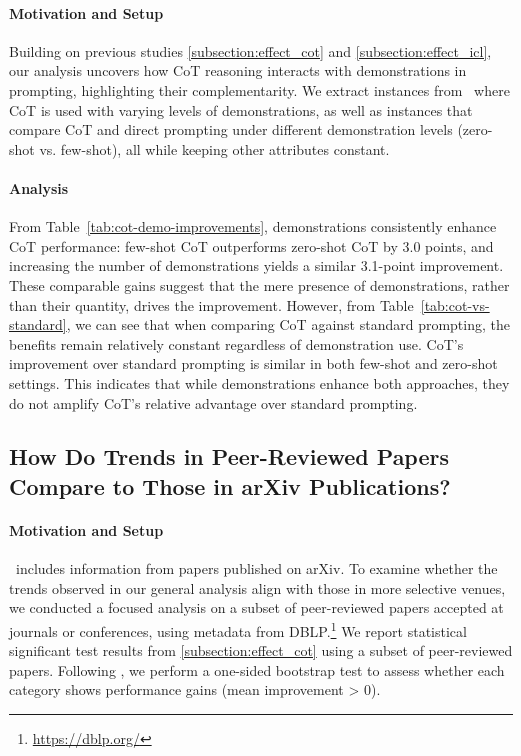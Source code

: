 \paragraph{Motivation and Setup}
Building on previous studies \cref{subsection:effect_cot} and \cref{subsection:effect_icl}, our analysis uncovers how CoT reasoning interacts with demonstrations in prompting, highlighting their complementarity. 
We extract instances from \datasetname~where CoT is used with varying levels of demonstrations, as well as instances that compare CoT and direct prompting under different demonstration levels (zero-shot vs. few-shot), all while keeping other attributes constant.

\paragraph{Analysis} 
From Table~\ref{tab:cot-demo-improvements}, demonstrations consistently enhance CoT performance: few-shot CoT outperforms zero-shot CoT by 3.0 points, and increasing the number of demonstrations yields a similar 3.1-point improvement. 
These comparable gains suggest that the mere presence of demonstrations, rather than their quantity, drives the improvement.
However, from Table~\ref{tab:cot-vs-standard}, we can see that when comparing CoT against standard prompting, the benefits remain relatively constant regardless of demonstration use. 
CoT's improvement over standard prompting is similar in both few-shot and zero-shot settings. 
This indicates that while demonstrations enhance both approaches, they do not amplify CoT's relative advantage over standard prompting.


\subsection{How Do Trends in Peer-Reviewed Papers Compare to Those in arXiv Publications?}
\label{subsection:subset_analysis}


\paragraph{Motivation and Setup}

\datasetname~includes information from papers published on arXiv. To examine whether the trends observed in our general analysis align with those in more selective venues, we conducted a focused analysis on a subset of peer-reviewed papers accepted at journals or conferences, using metadata from DBLP.\footnote{\url{https://dblp.org/}}
We report statistical significant test results from \ref{subsection:effect_cot} using a subset of peer-reviewed papers. Following \citet{sprague2024cot}, we perform a one-sided bootstrap test to assess whether each category shows performance gains (mean improvement > 0). 


